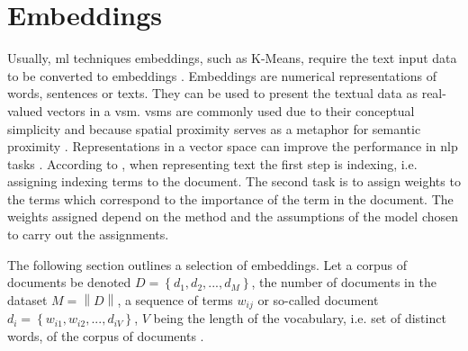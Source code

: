 \section{Embeddings}\label{sec:embeddings}

Usually, \ac{ml} techniques embeddings, such as K-Means, require the text input data to be converted to embeddings \cite{SentRep2014}.
Embeddings are numerical representations of words, sentences or texts.
They can be used to present the textual data as real-valued vectors in a \ac{vsm}.
\acp{vsm} are commonly used due to their conceptual simplicity and because spatial proximity serves as a metaphor for semantic proximity \cite{tfidf2008, UniversalSentEnc2018, HfsentTrans2019}.
Representations in a vector space can improve the performance in \ac{nlp} tasks \cite{SkipGram2013}.
According to \citeauthor{tfidf2008}, when representing text the first step is indexing, i.e. assigning indexing terms to the document.
The second task is to assign weights to the terms which correspond to the importance of the term in the document.
The weights assigned depend on the method and the assumptions of the model chosen to carry out the assignments.

The following section outlines a selection of embeddings.
Let a corpus of documents be denoted $D= \left\{d_1, d_2, ..., d_M  \right\}$, the number of documents in the dataset $M = \left\| D \right\|$,
a sequence of terms $w_{ij}$ or so-called document $d_i = \left\{w_{i1}, w_{i2}, ..., d_{iV}  \right\}$, $V$ being the length of the vocabulary, 
i.e. set of distinct words, of the corpus of documents \cite{clusteringDocs2020}.










